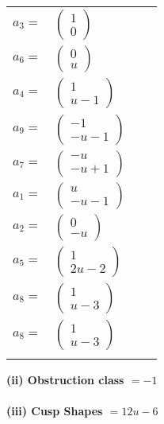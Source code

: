 \documentclass[1p]{elsarticle_modified}
\theoremstyle{definition}
\begin{document}
\begin{tabular}{m{7pt} m{180pt} m{7pt} m{180pt} }
\flushright $a_{3}=$&$\begin{pmatrix}1\\0\end{pmatrix}$ \\
\flushright $a_{6}=$&$\begin{pmatrix}0\\u\end{pmatrix}$ \\
\flushright $a_{4}=$&$\begin{pmatrix}1\\u-1\end{pmatrix}$ \\
\flushright $a_{9}=$&$\begin{pmatrix}-1\\- u-1\end{pmatrix}$ \\
\flushright $a_{7}=$&$\begin{pmatrix}- u\\- u+1\end{pmatrix}$ \\
\flushright $a_{1}=$&$\begin{pmatrix}u\\- u-1\end{pmatrix}$ \\
\flushright $a_{2}=$&$\begin{pmatrix}0\\- u\end{pmatrix}$ \\
\flushright $a_{5}=$&$\begin{pmatrix}1\\2 u-2\end{pmatrix}$ \\
\flushright $a_{8}=$&$\begin{pmatrix}1\\u-3\end{pmatrix}$\\ \flushright $a_{8}=$&$\begin{pmatrix}1\\u-3\end{pmatrix}$\\&\end{tabular}
\flushleft \textbf{(ii) Obstruction class $= -1$}\\~\\
\flushleft \textbf{(iii) Cusp Shapes $= 12 u-6$}\\~\\
\end{document}
